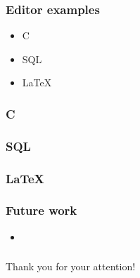 \documentclass[t,24pt,aspectratio=169]{beamer}
\begin{document}
\begin{frame}[hvid]
    \frametitle{Editor examples}
    \begin{itemize}
        \item C
        \item SQL
        \item \LaTeX
    \end{itemize}
\end{frame}


\begin{frame}[hvid]
    \frametitle{C}
\end{frame}

\begin{frame}[hvid]
    \frametitle{SQL}
\end{frame}

\begin{frame}[hvid]
    \frametitle{\LaTeX}
\end{frame}

\begin{frame}[hvid]
    \frametitle{Future work}

    \begin{itemize}
        \item
    \end{itemize}
\end{frame}



\begin{frame}[hvid]
    \frametitle{}
    \centering
    \large{Thank you for your attention!}
\end{frame}
\end{document}
